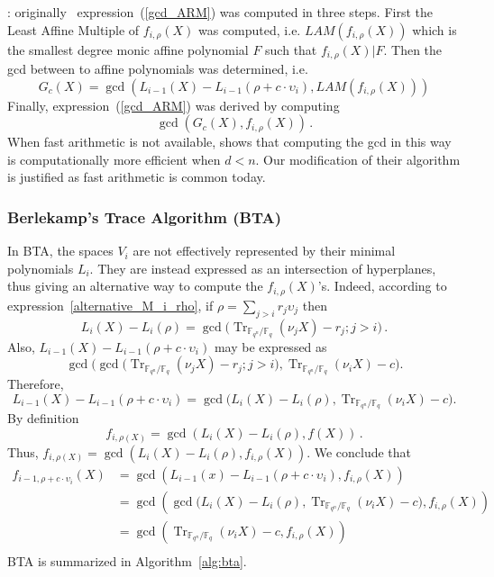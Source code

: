 \documentclass{article}
\newcommand{\ff}[1]{\mathbb{F}_{#1}}
\newcommand{\qq}{q}
\newcommand{\nn}{n}
\newcommand{\qn}{{\qq^\nn}}
\newcommand{\basef}{\ff{\qq}}
\newcommand{\extf}{\ff{\qn}}
\DeclareMathOperator{\Tr}{Tr}
\newcounter{algo}
\newcommand{\Notes}[1]{\textcolor{red}{Note: #1}}
\begin{document}
: originally~\cite{van1989geometric} expression~(\ref{gcd_ARM}) was computed in three steps. First the Least Affine Multiple of 
$f_{i,\rho}(X)$ was computed, i.e. $LAM(f_{i,\rho}(X))$ which is  the smallest degree monic affine polynomial $F$ such that $f_{i,\rho}(X)|F$. Then the gcd between to affine polynomials was determined, i.e. 
$$G_c(X)=\gcd(L_{i-1}(X)-L_{i-1}(\rho+c \cdot \upsilon_i),LAM(f_{i,\rho}(X)) ) $$
Finally, expression~(\ref{gcd_ARM}) was derived by computing
$$\gcd(G_c(X), f_{i,\rho}(X))\,.$$
When fast arithmetic is not available, \cite{van1989geometric} shows that computing the gcd in this way is computationally more efficient when $d<n$. Our modification of their algorithm is justified as fast arithmetic is common today.




\subsubsection{Berlekamp's Trace Algorithm (BTA)}
\label{sec:BTA}
In BTA, the spaces $V_{i}$ are not effectively represented by their minimal polynomials $L_i$. They are instead expressed as an intersection of hyperplanes, thus giving an alternative way to compute the $f_{i,\rho}(X)$'s. Indeed, according to expression~\eqref{alternative_M_i_rho}, if $\rho=\sum_{j>i}r_j\upsilon_j$ then
$$L_i(X)-L_i(\rho)=\gcd\bigl(\Tr_{\extf/\basef}(\nu_j X) -r_j ;j>i\bigr)\,.$$
Also, $L_{i-1}(X)-L_{i-1}(\rho +c \cdot \upsilon_i)$ may be expressed as
$$
\gcd\bigl(\gcd\bigl(\Tr_{\extf/\basef}(\nu_j X) -r_j ;j>i\bigr), \Tr_{\extf/\basef}(\nu_i X) -c  \bigr).
$$
Therefore, 
\begin{equation}
\label{alt_formula}
L_{i-1}(X)-L_{i-1}(\rho +c \cdot \upsilon_i)=
\gcd\bigl(L_i(X)-L_i(\rho), \Tr_{\extf/\basef}(\nu_i X) -c  \bigr).
\end{equation}
By definition 
$$f_{i,\rho(X)}=\gcd(L_i(X)-L_i(\rho),f(X))\,.$$ 
Thus, $f_{i,\rho(X)}=\gcd(L_i(X)-L_i(\rho),f_{i,\rho}(X))$.
We conclude that 
\begin{equation}
\label{eq:bta:key}
\begin{aligned}
f_{i-1,\rho+c \cdot \upsilon_i}(X)&=\gcd(L_{i-1}(x)-L_{i-1}(\rho +c \cdot \upsilon_i) ,f_{i,\rho}(X)  ) \\
&=  \gcd(  \gcd\bigl(L_i(X)-L_i(\rho), \Tr_{\extf/\basef}(\nu_i X) -c  \bigr)     ,  f_{i,\rho}(X) )    \\
&=  \gcd( \Tr_{\extf/\basef}(\nu_i X) -c ,  f_{i,\rho}(X) )    \\
\end{aligned}
\end{equation}
BTA is summarized in Algorithm~\ref{alg:bta}.
\end{document}
